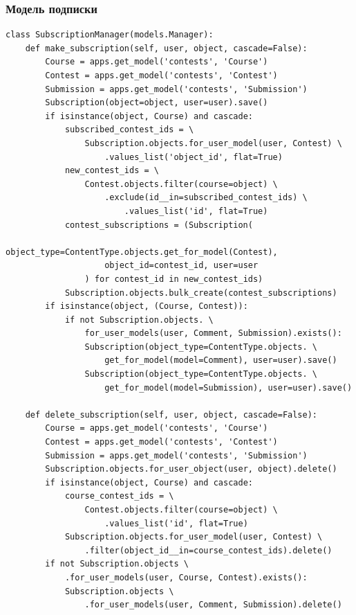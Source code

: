 \documentclass[12pt, a4paper, oneside]{article}
\begin{document}
\subsubsection{Модель подписки}
\begin{verbatim}
class SubscriptionManager(models.Manager):
    def make_subscription(self, user, object, cascade=False):
        Course = apps.get_model('contests', 'Course')
        Contest = apps.get_model('contests', 'Contest')
        Submission = apps.get_model('contests', 'Submission')
        Subscription(object=object, user=user).save()
        if isinstance(object, Course) and cascade:
            subscribed_contest_ids = \
                Subscription.objects.for_user_model(user, Contest) \
                    .values_list('object_id', flat=True)
            new_contest_ids = \
                Contest.objects.filter(course=object) \
                    .exclude(id__in=subscribed_contest_ids) \
                        .values_list('id', flat=True)
            contest_subscriptions = (Subscription(
                    object_type=ContentType.objects.get_for_model(Contest), 
                    object_id=contest_id, user=user
                ) for contest_id in new_contest_ids)
            Subscription.objects.bulk_create(contest_subscriptions)
        if isinstance(object, (Course, Contest)):
            if not Subscription.objects. \
                for_user_models(user, Comment, Submission).exists():
                Subscription(object_type=ContentType.objects. \
                    get_for_model(model=Comment), user=user).save()
                Subscription(object_type=ContentType.objects. \
                    get_for_model(model=Submission), user=user).save()

    def delete_subscription(self, user, object, cascade=False):
        Course = apps.get_model('contests', 'Course')
        Contest = apps.get_model('contests', 'Contest')
        Submission = apps.get_model('contests', 'Submission')
        Subscription.objects.for_user_object(user, object).delete()
        if isinstance(object, Course) and cascade:
            course_contest_ids = \
                Contest.objects.filter(course=object) \
                    .values_list('id', flat=True)
            Subscription.objects.for_user_model(user, Contest) \
                .filter(object_id__in=course_contest_ids).delete()
        if not Subscription.objects \
            .for_user_models(user, Course, Contest).exists():
            Subscription.objects \
                .for_user_models(user, Comment, Submission).delete()



\end{verbatim}
\end{document}
